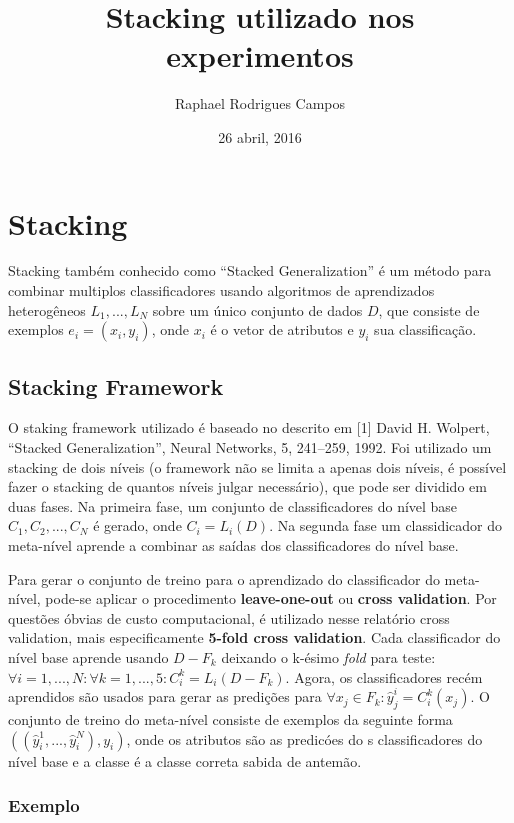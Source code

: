 \documentclass[]{article}
\title{Stacking utilizado nos experimentos}
\author{Raphael Rodrigues Campos}
\date{26 abril, 2016}
\begin{document}
\maketitle


\section{Stacking}\label{stacking}

Stacking também conhecido como ``Stacked Generalization'' é um método
para combinar multiplos classificadores usando algoritmos de
aprendizados heterogêneos \(L_1, ..., L_N\) sobre um único conjunto de
dados \(D\), que consiste de exemplos \(e_i = (x_i, y_i)\), onde \(x_i\)
é o vetor de atributos e \(y_i\) sua classificação.

\subsection{Stacking Framework}\label{stacking-framework}

O staking framework utilizado é baseado no descrito em {[}1{]} David H.
Wolpert, ``Stacked Generalization'', Neural Networks, 5, 241--259, 1992.
Foi utilizado um stacking de dois níveis (o framework não se limita a
apenas dois níveis, é possível fazer o stacking de quantos níveis julgar
necessário), que pode ser dividido em duas fases. Na primeira fase, um
conjunto de classificadores do nível base \(C_1, C_2, ..., C_N\) é
gerado, onde \(C_i = L_i(D)\). Na segunda fase um classidicador do
meta-nível aprende a combinar as saídas dos classificadores do nível
base.

Para gerar o conjunto de treino para o aprendizado do classificador do
meta-nível, pode-se aplicar o procedimento \textbf{leave-one-out} ou
\textbf{cross validation}. Por questões óbvias de custo computacional, é
utilizado nesse relatório cross validation, mais especificamente
\textbf{5-fold cross validation}. Cada classificador do nível base
aprende usando \(D - F_k\) deixando o k-ésimo \emph{fold} para teste:
\(\forall i = 1,...,N : \forall k = 1,...,5 : C^{k}_i = L_i(D-F_k)\).
Agora, os classificadores recém aprendidos são usados para gerar as
predições para \(\forall x_j \in F_k:\hat{y}_j^i=C^k_i(x_j)\). O
conjunto de treino do meta-nível consiste de exemplos da seguinte forma
\(((\hat{y}_i^1,..., \hat{y}_i^N), y_i)\), onde os atributos são as
predicóes do s classificadores do nível base e a classe é a classe
correta sabida de antemão.

\subsubsection{Exemplo}\label{exemplo}
\end{document}
